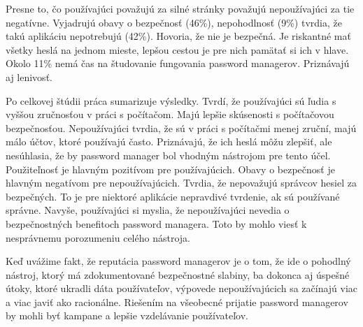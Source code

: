 Presne to, čo používajúci považujú za silné stránky považujú nepoužívajúci za tie negatívne. Vyjadrujú obavy o bezpečnosť (46\%), nepohodlnosť (9\%) tvrdia, že takú aplikáciu nepotrebujú (42\%). Hovoria, že nie je bezpečná. Je riskantné mať všetky heslá na jednom mieste, lepšou cestou je pre nich pamätať si ich v hlave. Okolo 11\% nemá čas na študovanie fungovania password managerov. Priznávajú aj lenivosť. 

Po celkovej štúdii práca sumarizuje výsledky. Tvrdí, že používajúci sú ľudia s vyššou zručnosťou v práci s počítačom. Majú lepšie skúsenosti s počítačovou bezpečnosťou. Nepoužívajúci tvrdia, že sú v práci s počítačmi menej zruční, majú málo účtov, ktoré používajú často. Priznávajú, že ich heslá môžu zlepšiť, ale nesúhlasia, že by password manager bol vhodným nástrojom pre tento účel. Použiteľnosť je hlavným pozitívom pre používajúcich. Obavy o bezpečnosť je hlavným negatívom pre nepoužívajúcich. Tvrdia, že nepovažujú správcov hesiel za bezpečných. To je pre niektoré aplikácie nepravdivé tvrdenie, ak sú používané správne. Navyše, používajúci si myslia, že nepoužívajúci nevedia o bezpečnostných benefitoch password managera. Toto by mohlo viesť k nesprávnemu porozumeniu celého nástroja.

Keď uvážime fakt, že reputácia password managerov je o tom, že ide o pohodlný nástroj, ktorý má zdokumentované bezpečnostné slabiny, ba dokonca aj úspešné útoky, ktoré ukradli dáta používateľov, výpovede nepoužívajúcich sa začínajú viac a viac javiť ako racionálne. Riešením na všeobecné prijatie password managerov by mohli byť kampane a lepšie vzdelávanie používateľov.
